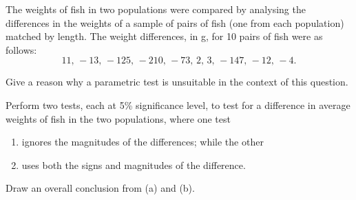\begin{problem}
    The weights of fish in two populations were compared by analysing the differences in the weights of a sample of pairs of fish (one from each population) matched by length. The weight differences, in g, for 10 pairs of fish were as follows: \[11, \, -13, \, -125, \, -210, \, -73, \, 2, \, 3, \, -147, \, -12, \, -4.\]

    Give a reason why a parametric test is unsuitable in the context of this question.

    Perform two tests, each at 5\% significance level, to test for a difference in average weights of fish in the two populations, where one test
    \begin{enumerate}
        \item ignores the magnitudes of the differences; while the other
        \item uses both the signs and magnitudes of the difference.
    \end{enumerate}
    Draw an overall conclusion from (a) and (b).
\end{problem}
